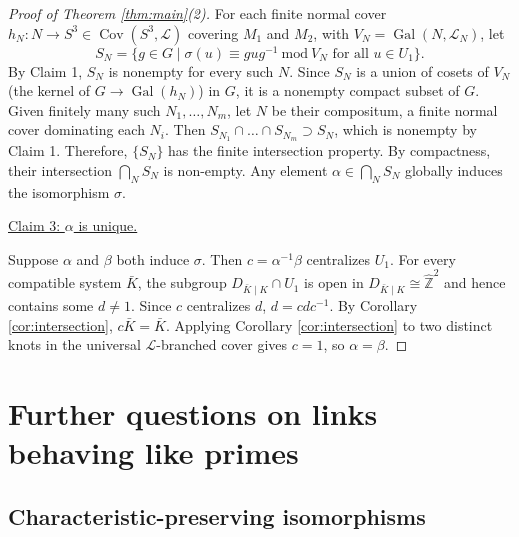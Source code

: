 \documentclass{amsart}
\theoremstyle{plain}
\theoremstyle{definition}
\theoremstyle{plain}
\theoremstyle{plain}
\theoremstyle{plain}
\theoremstyle{remark}
\theoremstyle{remark}
\theoremstyle{plain}
\theoremstyle{definition}
\theoremstyle{plain}
\DeclareMathOperator{\Gal}{\mathrm{Gal}}
\DeclareMathOperator{\Cov}{\mathrm{Cov}}
\newcounter{main}
\theoremstyle{plain}
\theoremstyle{plain}
\numberwithin{equation}{section}
\begin{document}
\begin{proof}[Proof of Theorem \ref{thm:main}(2)]
\medskip

For each finite normal cover $h_N: N \to S^3 \in \Cov(S^3, \mathcal{L})$ covering $M_1$ and $M_2$, with $V_N = \Gal(N, \mathcal L_N)$, let 
\begin{equation}
    S_N = \{g \in G \mid \sigma(u) \equiv gug^{-1} \ \mathrm{mod} \ {V_N} \text{ for all } u \in U_1\}.
\end{equation}
By Claim 1, $S_N$ is nonempty for every such $N$. Since $S_N$ is a union of cosets of $V_N$ (the kernel of $G \to \Gal(h_N)$) in $G$, it is a nonempty compact subset of $G$. Given finitely many such $N_1, \dots, N_m$, let $N$ be their compositum, a finite normal cover dominating each $N_i$. Then $S_{N_1} \cap \dots \cap S_{N_m} \supset S_N$, which is nonempty by Claim 1. Therefore, $\{S_N\}$ has the finite intersection property. By compactness, their intersection $\bigcap_NS_N$ is non-empty. Any element $\alpha \in \bigcap_N S_N$ globally induces the isomorphism $\sigma$.

\medskip

\underline{Claim 3: $\alpha$ is unique.} 

\medskip

Suppose $\alpha$ and $\beta$ both induce $\sigma$. Then $c = \alpha^{-1}\beta$ centralizes $U_1$. For every compatible system $\bar K$, the subgroup $D_{\bar K\mid K} \cap U_1$ is open in $D_{\bar K\mid K} \cong \widehat{\mathbb Z}^2$ and hence contains some $d \neq 1$. Since $c$ centralizes $d$, $d = cdc^{-1}$. By Corollary \ref{cor:intersection}, $c\bar K = \bar K$. Applying Corollary \ref{cor:intersection} to two distinct knots in the universal $\mathcal L$-branched cover gives $c = 1$, so $\alpha = \beta$.

\end{proof}

\section{Further questions on links behaving like primes}\label{sec:future}

\subsection{Characteristic-preserving isomorphisms}\label{sec:charpres}
\end{document}
